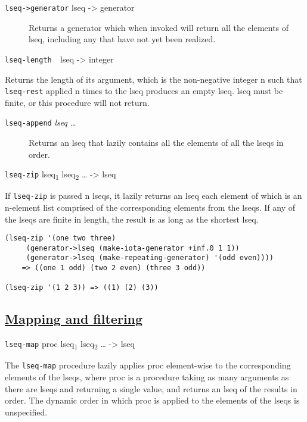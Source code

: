 \begin{description}
\item[ \href{}{} \texttt{lseq-\textgreater{}generator} lseq
-\textgreater{} generator ]
Returns a generator which when invoked will return all the elements of
lseq, including any that have not yet been realized.
\end{description}

\href{}{} \texttt{lseq-length\ \ }lseq -\textgreater{} integer

Returns the length of its argument, which is the non-negative integer n
such that \texttt{lseq-rest} applied n times to the lseq produces an
empty lseq. lseq must be finite, or this procedure will not return.

\begin{description}
\item[\texttt{lseq-append} \emph{lseq \ldots{}}]
Returns an lseq that lazily contains all the elements of all the lseqs
in order.
\end{description}

\href{}{}

\texttt{lseq-zip} lseq\textsubscript{1} lseq\textsubscript{2} \ldots{}
-\textgreater{} lseq

If \texttt{lseq-zip} is passed n lseqs, it lazily returns an lseq each
element of which is an n-element list comprised of the corresponding
elements from the lseqs. If any of the lseqs are finite in length, the
result is as long as the shortest lseq.

\begin{verbatim}
(lseq-zip '(one two three) 
     (generator->lseq (make-iota-generator +inf.0 1 1))
     (generator->lseq (make-repeating-generator) '(odd even))))
    => ((one 1 odd) (two 2 even) (three 3 odd))

(lseq-zip '(1 2 3)) => ((1) (2) (3))
\end{verbatim}

\subsection{\texorpdfstring{\href{}{Mapping and
filtering}}{Mapping and filtering}}\label{mapping-and-filtering}

\href{}{} \texttt{lseq-map} proc lseq\textsubscript{1}
lseq\textsubscript{2} \ldots{} -\textgreater{} lseq

The \texttt{lseq-map} procedure lazily applies proc element-wise to the
corresponding elements of the lseqs, where proc is a procedure taking as
many arguments as there are lseqs and returning a single value, and
returns an lseq of the results in order. The dynamic order in which proc
is applied to the elements of the lseqs is unspecified.

